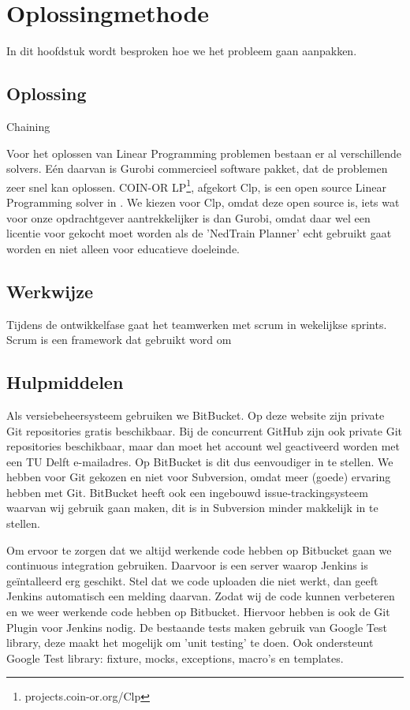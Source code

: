 \section{Oplossingmethode}
In dit hoofdstuk wordt besproken hoe we het probleem gaan aanpakken. 

\subsection{Oplossing}
Chaining

Voor het oplossen van Linear Programming problemen bestaan er al verschillende solvers. E\'en daarvan is Gurobi commercieel software pakket, dat de problemen zeer snel kan oplossen. COIN-OR LP\footnote{projects.coin-or.org/Clp}, afgekort Clp, is een open source Linear Programming solver in \cpp . We kiezen voor Clp, omdat deze open source is, iets wat voor onze opdrachtgever aantrekkelijker is dan Gurobi, omdat daar wel een licentie voor gekocht moet worden als de 'NedTrain Planner' echt gebruikt gaat worden en niet alleen voor educatieve doeleinde. 

\subsection{Werkwijze}
Tijdens de ontwikkelfase gaat het teamwerken met scrum in wekelijkse sprints. Scrum is een framework dat gebruikt word om 

\subsection{Hulpmiddelen}
Als versiebeheersysteem gebruiken we BitBucket. Op deze website zijn private Git repositories gratis beschikbaar. Bij de concurrent GitHub zijn ook private Git repositories beschikbaar, maar dan moet het account wel geactiveerd worden met een TU Delft e-mailadres. Op BitBucket is dit dus eenvoudiger in te stellen. We hebben voor Git gekozen en niet voor Subversion, omdat meer (goede) ervaring hebben met Git. BitBucket heeft ook een ingebouwd issue-trackingsysteem waarvan wij gebruik gaan maken, dit is in Subversion minder makkelijk in te stellen.

Om ervoor te zorgen dat we altijd werkende code hebben op Bitbucket gaan we continuous integration gebruiken. Daarvoor is een server waarop Jenkins is ge\"intalleerd erg geschikt. Stel dat we code uploaden die niet werkt, dan geeft Jenkins automatisch een melding daarvan. Zodat wij de code kunnen verbeteren en we weer werkende code hebben op Bitbucket. Hiervoor hebben is ook de Git Plugin voor Jenkins nodig. De bestaande tests maken gebruik van Google Test library, deze maakt het mogelijk om 'unit testing' te doen. Ook ondersteunt Google Test library: fixture, mocks, exceptions, macro's en templates. 

